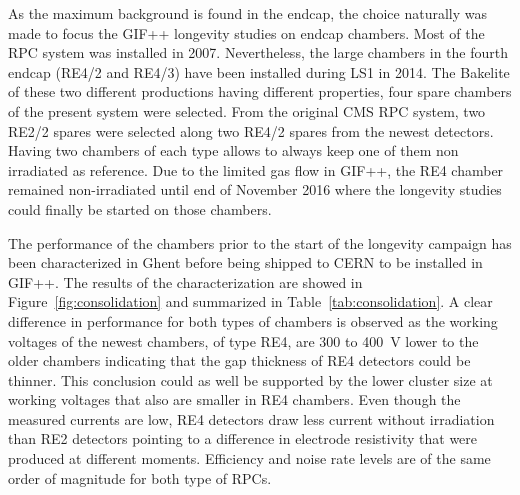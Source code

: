     As the maximum background is found in the endcap, the choice naturally was made to focus the GIF++ longevity studies on endcap chambers. Most of the RPC system was installed in 2007. Nevertheless, the large chambers in the fourth endcap (RE4/2 and RE4/3) have been installed during LS1 in 2014. The Bakelite of these two different productions having different properties, four spare chambers of the present system were selected. From the original CMS RPC system, two RE2/2 spares were selected along two RE4/2 spares from the newest detectors. Having two chambers of each type allows to always keep one of them non irradiated as reference. Due to the limited gas flow in GIF++, the RE4 chamber remained non-irradiated until end of November 2016 where the longevity studies could finally be started on those chambers.
    
    The performance of the chambers prior to the start of the longevity campaign has been characterized in Ghent before being shipped to CERN to be installed in GIF++. The results of the characterization are showed in Figure~\ref{fig:consolidation} and summarized in Table~\ref{tab:consolidation}. A clear difference in performance for both types of chambers is observed as the working voltages of the newest chambers, of type RE4, are 300 to \SI{400}{V} lower to the older chambers indicating that the gap thickness of RE4 detectors could be thinner. This conclusion could as well be supported by the lower cluster size at working voltages that also are smaller in RE4 chambers. Even though the measured currents are low, RE4 detectors draw less current without irradiation than RE2 detectors pointing to a difference in electrode resistivity that were produced at different moments. Efficiency and noise rate levels are of the same order of magnitude for both type of RPCs.
	

